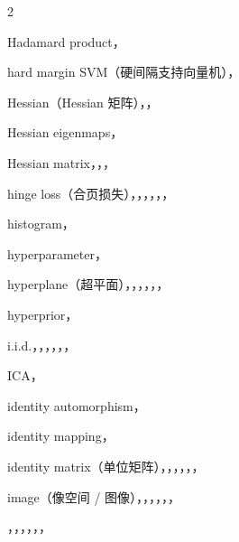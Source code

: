 \begin{multicols}{2}
\medskip{}\par\smallskip
\noindent Hadamard product，\par
\noindent hard margin SVM（硬间隔支持向量机），\par
\noindent Hessian（Hessian 矩阵），，\par
\noindent Hessian eigenmaps，\par
\noindent Hessian matrix，，，\par
\noindent hinge loss（合页损失），，，，，，\par
\noindent histogram，\par
\noindent hyperparameter，\par
\noindent hyperplane（超平面），，，，，，\par
\noindent hyperprior，\par

\medskip{}\par\smallskip
\noindent i.i.d.，，，，，，\par
\noindent ICA，\par
\noindent identity automorphism，\par
\noindent identity mapping，\par
\noindent identity matrix（单位矩阵），，，，，，\par
\noindent image（像空间 / 图像），，，，，，\par

\medskip\noindent{\hei #}\par\smallskip
{}，，，，，，\par


\end{multicols}
